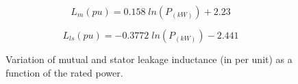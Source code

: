 \documentclass[twocolumn]{article}
\begin{document}
\begin{equation}
 	L_m (pu) = 0.158\;ln (P_{(kW)}) + 2.23
 	\label{eq:Lm}
 \end{equation} 

\begin{equation}
 	L_{ls}(pu) = -0.3772 \;ln (P_{(kW)}) - 2.441
 	\label{eq:Lls}
 \end{equation} 


\begin{figure}[]
  \centering

    \caption{Variation of mutual and stator leakage inductance (in per unit) as a function of the rated power.} 
    \label{inductance_plots}
\end{figure}

\end{document}
